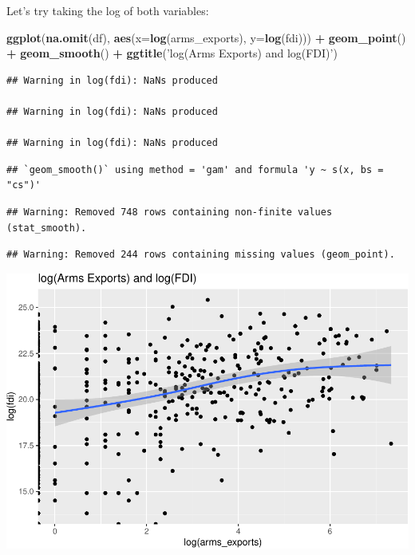 \documentclass[12pt,]{article}
\newenvironment{Shaded}{\begin{snugshade}}{\end{snugshade}}
\newcommand{\DataTypeTok}[1]{\textcolor[rgb]{0.13,0.29,0.53}{#1}}
\newcommand{\KeywordTok}[1]{\textcolor[rgb]{0.13,0.29,0.53}{\textbf{#1}}}
\newcommand{\NormalTok}[1]{#1}
\newcommand{\OperatorTok}[1]{\textcolor[rgb]{0.81,0.36,0.00}{\textbf{#1}}}
\newcommand{\StringTok}[1]{\textcolor[rgb]{0.31,0.60,0.02}{#1}}
\begin{document}
Let's try taking the log of both variables:

\begin{Shaded}
\begin{Highlighting}[]
\KeywordTok{ggplot}\NormalTok{(}\KeywordTok{na.omit}\NormalTok{(df), }\KeywordTok{aes}\NormalTok{(}\DataTypeTok{x=}\KeywordTok{log}\NormalTok{(arms_exports), }\DataTypeTok{y=}\KeywordTok{log}\NormalTok{(fdi))) }\OperatorTok{+}\StringTok{ }
\StringTok{    }\KeywordTok{geom_point}\NormalTok{() }\OperatorTok{+}
\StringTok{    }\KeywordTok{geom_smooth}\NormalTok{() }\OperatorTok{+}
\StringTok{    }\KeywordTok{ggtitle}\NormalTok{(}\StringTok{'log(Arms Exports) and log(FDI)'}\NormalTok{)}
\end{Highlighting}
\end{Shaded}

\begin{verbatim}
## Warning in log(fdi): NaNs produced

## Warning in log(fdi): NaNs produced

## Warning in log(fdi): NaNs produced
\end{verbatim}

\begin{verbatim}
## `geom_smooth()` using method = 'gam' and formula 'y ~ s(x, bs = "cs")'
\end{verbatim}

\begin{verbatim}
## Warning: Removed 748 rows containing non-finite values (stat_smooth).
\end{verbatim}

\begin{verbatim}
## Warning: Removed 244 rows containing missing values (geom_point).
\end{verbatim}

\includegraphics{proposal_files/figure-latex/unnamed-chunk-22-1.pdf}
\end{document}
